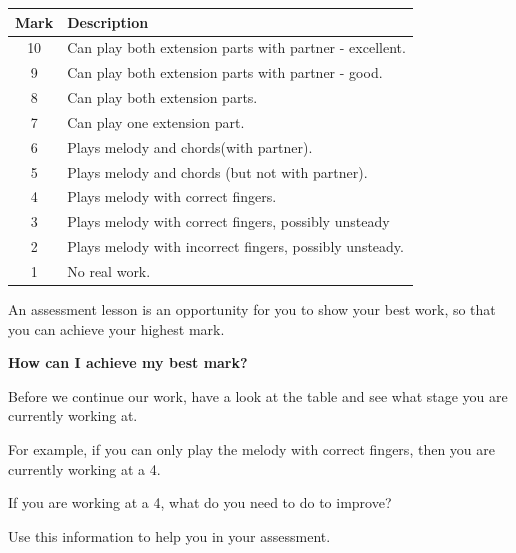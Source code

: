 \documentclass{article}
\begin{document}
\begin{center}
\begin{tabularx}{\textwidth}{|c|X|} %
\hline
\textbf{Mark} & \textbf{Description} \\
\hline
10 & Can play both extension parts with partner - excellent.\\
\hline
9 & Can play both extension parts with partner - good. \\
\hline
8 & Can play both extension parts. \\
\hline
7 & Can play one extension part. \\
\hline
6 & Plays melody and chords(with partner). \\
\hline
5 & Plays melody and chords (but not with partner). \\
\hline
4 & Plays melody with correct fingers. \\
\hline
3 & Plays melody with correct fingers, possibly unsteady \\
\hline
2 & Plays melody with incorrect fingers, possibly unsteady.\\
\hline
1 & No real work. \\
\hline
\end{tabularx} %
\end{center}

\vspace{1em}

\noindent An assessment lesson is an opportunity for you to show your best work, so that you can achieve your highest mark.

\vspace{1em}

\noindent \textbf{How can I achieve my best mark?}

\vspace{1em}

\noindent Before we continue our work, have a look at the table and see what stage you are currently working at.

\noindent For example, if you can only play the melody with correct fingers, then you are currently working at a 4.

\vspace{1em}

\noindent If you are working at a 4, what do you need to do to improve?

\noindent Use this information to help you in your assessment.
\end{document}
